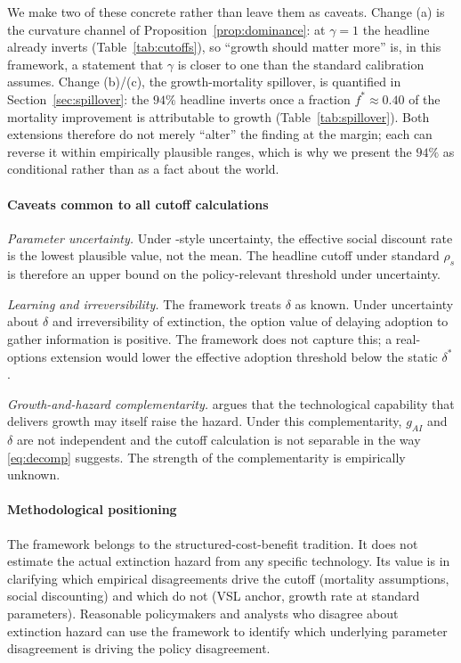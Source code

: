 \documentclass{_latex/house}
\begin{document}
We make two of these concrete rather than leave them as caveats. Change (a) is the curvature channel of Proposition~\ref{prop:dominance}: at $\gamma=1$ the headline already inverts (Table~\ref{tab:cutoffs}), so ``growth should matter more'' is, in this framework, a statement that $\gamma$ is closer to one than the standard calibration assumes. Change (b)/(c), the growth-mortality spillover, is quantified in Section~\ref{sec:spillover}: the $94\%$ headline inverts once a fraction $f^*\approx0.40$ of the mortality improvement is attributable to growth (Table~\ref{tab:spillover}). Both extensions therefore do not merely ``alter'' the finding at the margin; each can reverse it within empirically plausible ranges, which is why we present the $94\%$ as conditional rather than as a fact about the world.

\paragraph{Caveats common to all cutoff calculations}

\emph{Parameter uncertainty.} Under \citet{weitzman2007review}-style uncertainty, the effective social discount rate is the lowest plausible value, not the mean. The headline cutoff under standard $\rho_s$ is therefore an upper bound on the policy-relevant threshold under uncertainty.

\emph{Learning and irreversibility.} The framework treats $\delta$ as known. Under uncertainty about $\delta$ and irreversibility of extinction, the option value of delaying adoption to gather information is positive. The framework does not capture this; a real-options extension would lower the effective adoption threshold below the static $\delta^*$.

\emph{Growth-and-hazard complementarity.} \citet{jones2024aidilemma} argues that the technological capability that delivers growth may itself raise the hazard. Under this complementarity, $g_{AI}$ and $\delta$ are not independent and the cutoff calculation is not separable in the way \eqref{eq:decomp} suggests. The strength of the complementarity is empirically unknown.

\paragraph{Methodological positioning} The framework belongs to the structured-cost-benefit tradition. It does not estimate the actual extinction hazard from any specific technology. Its value is in clarifying which empirical disagreements drive the cutoff (mortality assumptions, social discounting) and which do not (VSL anchor, growth rate at standard parameters). Reasonable policymakers and analysts who disagree about extinction hazard can use the framework to identify which underlying parameter disagreement is driving the policy disagreement.
\end{document}
